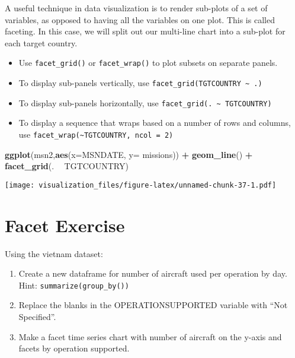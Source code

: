 \documentclass[oneside]{memoir}
\newenvironment{Shaded}{\begin{snugshade}}{\end{snugshade}}
\newcommand{\KeywordTok}[1]{\textcolor[rgb]{0.13,0.29,0.53}{\textbf{#1}}}
\newcommand{\DataTypeTok}[1]{\textcolor[rgb]{0.13,0.29,0.53}{#1}}
\newcommand{\StringTok}[1]{\textcolor[rgb]{0.31,0.60,0.02}{#1}}
\newcommand{\OperatorTok}[1]{\textcolor[rgb]{0.81,0.36,0.00}{\textbf{#1}}}
\newcommand{\NormalTok}[1]{#1}
\theoremstyle{definition}
\theoremstyle{definition}
\theoremstyle{definition}
\theoremstyle{remark}
\begin{document}
A useful technique in data visualization is to render sub-plots of a set
of variables, as opposed to having all the variables on one plot. This
is called faceting. In this case, we will split out our multi-line chart
into a sub-plot for each target country.

\begin{itemize}
\item
  Use \texttt{facet\_grid()} or \texttt{facet\_wrap()} to plot subsets
  on separate panels.
\item
  To display sub-panels vertically, use
  \texttt{facet\_grid(TGTCOUNTRY\ \textasciitilde{}\ .)}
\item
  To display sub-panels horizontally, use
  \texttt{facet\_grid(.\ \textasciitilde{}\ TGTCOUNTRY)}
\item
  To display a sequence that wraps based on a number of rows and
  columns, use
  \texttt{facet\_wrap(\textasciitilde{}TGTCOUNTRY,\ ncol\ =\ 2)}
\end{itemize}

\begin{Shaded}
\begin{Highlighting}[]
\KeywordTok{ggplot}\NormalTok{(msn2,}\KeywordTok{aes}\NormalTok{(}\DataTypeTok{x=}\NormalTok{MSNDATE, }\DataTypeTok{y=}\NormalTok{ missions)) }\OperatorTok{+}
\StringTok{  }\KeywordTok{geom_line}\NormalTok{() }\OperatorTok{+}
\StringTok{  }\KeywordTok{facet_grid}\NormalTok{(. }\OperatorTok{~}\StringTok{ }\NormalTok{TGTCOUNTRY)}
\end{Highlighting}
\end{Shaded}

\texttt{[image: visualization\_files/figure-latex/unnamed-chunk-37-1.pdf]}

\section{Facet Exercise}\label{facet-exercise}

Using the vietnam dataset:

\begin{enumerate}
\def\labelenumi{\arabic{enumi}.}
\item
  Create a new dataframe for number of aircraft used per operation by
  day. Hint: \texttt{summarize(group\_by())}
\item
  Replace the blanks in the OPERATIONSUPPORTED variable with ``Not
  Specified''.
\item
  Make a facet time series chart with number of aircraft on the y-axis
  and facets by operation supported.
\end{enumerate}
\end{document}
